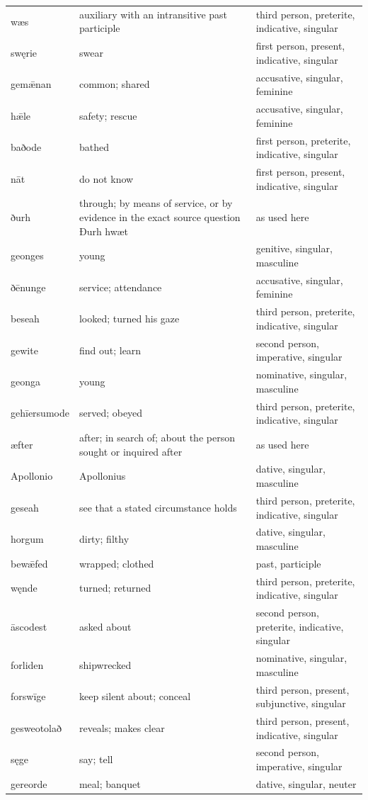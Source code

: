 \begin{longtable}{@{}>{\raggedright\arraybackslash}p{26mm}>{\raggedright\arraybackslash}p{44.5mm}>{\raggedright\arraybackslash}p{47.88mm}@{}}
wæs & auxiliary with an intransitive past participle & third person, preterite, indicative, singular \\
swęrie & swear & first person, present, indicative, singular \\
gemǣnan & common; shared & accusative, singular, feminine \\
hǣle & safety; rescue & accusative, singular, feminine \\
baðode & bathed & first person, preterite, indicative, singular \\
nāt & do not know & first person, present, indicative, singular \\
ðurh & through; by means of service, or by evidence in the exact source question Ðurh hwæt & as used here \\
geonges & young & genitive, singular, masculine \\
ðēnunge & service; attendance & accusative, singular, feminine \\
beseah & looked; turned his gaze & third person, preterite, indicative, singular \\
gewite & find out; learn & second person, imperative, singular \\
geonga & young & nominative, singular, masculine \\
gehīersumode & served; obeyed & third person, preterite, indicative, singular \\
æfter & after; in search of; about the person sought or inquired after & as used here \\
Apollonio & Apollonius & dative, singular, masculine \\
geseah & see that a stated circumstance holds & third person, preterite, indicative, singular \\
horgum & dirty; filthy & dative, singular, masculine \\
bewǣfed & wrapped; clothed & past, participle \\
węnde & turned; returned & third person, preterite, indicative, singular \\
āscodest & asked about & second person, preterite, indicative, singular \\
forliden & shipwrecked & nominative, singular, masculine \\
forswīge & keep silent about; conceal & third person, present, subjunctive, singular \\
gesweotolað & reveals; makes clear & third person, present, indicative, singular \\
sęge & say; tell & second person, imperative, singular \\
gereorde & meal; banquet & dative, singular, neuter \\
\end{longtable}
\par\endgroup

